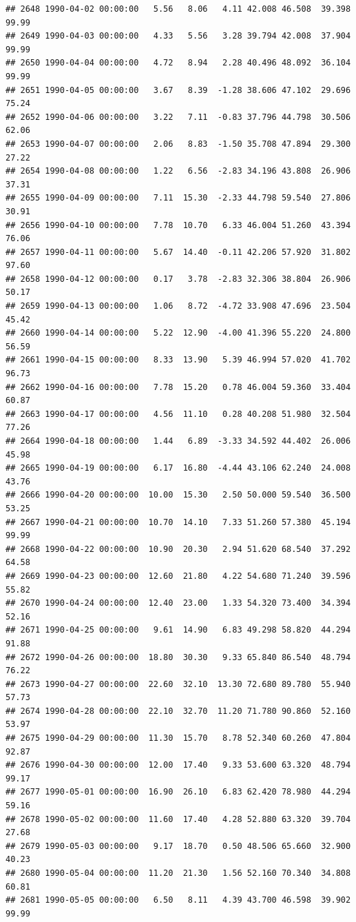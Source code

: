 \documentclass{article}\usepackage{graphicx, color}
\makeatletter
\newenvironment{kframe}{%
 \def\at@end@of@kframe{}%
 \ifinner\ifhmode%
  \def\at@end@of@kframe{\end{minipage}}%
  \begin{minipage}{\columnwidth}%
 \fi\fi%
 \def\FrameCommand##1{\hskip\@totalleftmargin \hskip-\fboxsep
 \colorbox{shadecolor}{##1}\hskip-\fboxsep
     \hskip-\linewidth \hskip-\@totalleftmargin \hskip\columnwidth}%
 \MakeFramed {\advance\hsize-\width
   \@totalleftmargin\z@ \linewidth\hsize
   \@setminipage}}%
 {\par\unskip\endMakeFramed%
 \at@end@of@kframe}
\newenvironment{knitrout}{}{} %
\makeatother
\begin{document}
\begin{knitrout}
\begin{kframe}
\begin{verbatim}
## 2648 1990-04-02 00:00:00   5.56   8.06   4.11 42.008 46.508  39.398  99.99
## 2649 1990-04-03 00:00:00   4.33   5.56   3.28 39.794 42.008  37.904  99.99
## 2650 1990-04-04 00:00:00   4.72   8.94   2.28 40.496 48.092  36.104  99.99
## 2651 1990-04-05 00:00:00   3.67   8.39  -1.28 38.606 47.102  29.696  75.24
## 2652 1990-04-06 00:00:00   3.22   7.11  -0.83 37.796 44.798  30.506  62.06
## 2653 1990-04-07 00:00:00   2.06   8.83  -1.50 35.708 47.894  29.300  27.22
## 2654 1990-04-08 00:00:00   1.22   6.56  -2.83 34.196 43.808  26.906  37.31
## 2655 1990-04-09 00:00:00   7.11  15.30  -2.33 44.798 59.540  27.806  30.91
## 2656 1990-04-10 00:00:00   7.78  10.70   6.33 46.004 51.260  43.394  76.06
## 2657 1990-04-11 00:00:00   5.67  14.40  -0.11 42.206 57.920  31.802  97.60
## 2658 1990-04-12 00:00:00   0.17   3.78  -2.83 32.306 38.804  26.906  50.17
## 2659 1990-04-13 00:00:00   1.06   8.72  -4.72 33.908 47.696  23.504  45.42
## 2660 1990-04-14 00:00:00   5.22  12.90  -4.00 41.396 55.220  24.800  56.59
## 2661 1990-04-15 00:00:00   8.33  13.90   5.39 46.994 57.020  41.702  96.73
## 2662 1990-04-16 00:00:00   7.78  15.20   0.78 46.004 59.360  33.404  60.87
## 2663 1990-04-17 00:00:00   4.56  11.10   0.28 40.208 51.980  32.504  77.26
## 2664 1990-04-18 00:00:00   1.44   6.89  -3.33 34.592 44.402  26.006  45.98
## 2665 1990-04-19 00:00:00   6.17  16.80  -4.44 43.106 62.240  24.008  43.76
## 2666 1990-04-20 00:00:00  10.00  15.30   2.50 50.000 59.540  36.500  53.25
## 2667 1990-04-21 00:00:00  10.70  14.10   7.33 51.260 57.380  45.194  99.99
## 2668 1990-04-22 00:00:00  10.90  20.30   2.94 51.620 68.540  37.292  64.58
## 2669 1990-04-23 00:00:00  12.60  21.80   4.22 54.680 71.240  39.596  55.82
## 2670 1990-04-24 00:00:00  12.40  23.00   1.33 54.320 73.400  34.394  52.16
## 2671 1990-04-25 00:00:00   9.61  14.90   6.83 49.298 58.820  44.294  91.88
## 2672 1990-04-26 00:00:00  18.80  30.30   9.33 65.840 86.540  48.794  76.22
## 2673 1990-04-27 00:00:00  22.60  32.10  13.30 72.680 89.780  55.940  57.73
## 2674 1990-04-28 00:00:00  22.10  32.70  11.20 71.780 90.860  52.160  53.97
## 2675 1990-04-29 00:00:00  11.30  15.70   8.78 52.340 60.260  47.804  92.87
## 2676 1990-04-30 00:00:00  12.00  17.40   9.33 53.600 63.320  48.794  99.17
## 2677 1990-05-01 00:00:00  16.90  26.10   6.83 62.420 78.980  44.294  59.16
## 2678 1990-05-02 00:00:00  11.60  17.40   4.28 52.880 63.320  39.704  27.68
## 2679 1990-05-03 00:00:00   9.17  18.70   0.50 48.506 65.660  32.900  40.23
## 2680 1990-05-04 00:00:00  11.20  21.30   1.56 52.160 70.340  34.808  60.81
## 2681 1990-05-05 00:00:00   6.50   8.11   4.39 43.700 46.598  39.902  99.99

\end{verbatim}
\end{kframe}
\end{knitrout}
\end{document}
